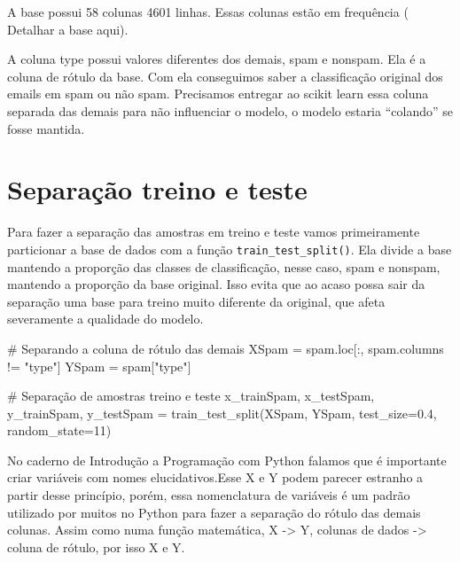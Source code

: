 \documentclass[
  letterpaper,
  DIV=11,
  numbers=noendperiod]{scrreprt}
\newenvironment{Shaded}{\begin{snugshade}}{\end{snugshade}}
\newcommand{\CommentTok}[1]{\textcolor[rgb]{0.37,0.37,0.37}{#1}}
\newcommand{\DecValTok}[1]{\textcolor[rgb]{0.68,0.00,0.00}{#1}}
\newcommand{\FloatTok}[1]{\textcolor[rgb]{0.68,0.00,0.00}{#1}}
\newcommand{\NormalTok}[1]{\textcolor[rgb]{0.00,0.23,0.31}{#1}}
\newcommand{\OperatorTok}[1]{\textcolor[rgb]{0.37,0.37,0.37}{#1}}
\newcommand{\StringTok}[1]{\textcolor[rgb]{0.13,0.47,0.30}{#1}}
\begin{document}
A base possui 58 colunas 4601 linhas. Essas colunas estão em frequência
( Detalhar a base aqui).

A coluna type possui valores diferentes dos demais, spam e nonspam. Ela
é a coluna de rótulo da base. Com ela conseguimos saber a classificação
original dos emails em spam ou não spam. Precisamos entregar ao scikit
learn essa coluna separada das demais para não influenciar o modelo, o
modelo estaria ``colando'' se fosse mantida.

\hypertarget{separauxe7uxe3o-treino-e-teste}{%
\section{Separação treino e
teste}\label{separauxe7uxe3o-treino-e-teste}}

Para fazer a separação das amostras em treino e teste vamos
primeiramente particionar a base de dados com a função
\texttt{train\_test\_split()}. Ela divide a base mantendo a proporção
das classes de classificação, nesse caso, spam e nonspam, mantendo a
proporção da base original. Isso evita que ao acaso possa sair da
separação uma base para treino muito diferente da original, que afeta
severamente a qualidade do modelo.

\begin{Shaded}
\begin{Highlighting}[]
\CommentTok{\# Separando a coluna de rótulo das demais}
\NormalTok{XSpam }\OperatorTok{=}\NormalTok{ spam.loc[:, spam.columns }\OperatorTok{!=} \StringTok{"type"}\NormalTok{]}
\NormalTok{YSpam }\OperatorTok{=}\NormalTok{ spam[}\StringTok{"type"}\NormalTok{]}

\CommentTok{\# Separação de amostras treino e teste}
\NormalTok{x\_trainSpam, x\_testSpam, y\_trainSpam, y\_testSpam }\OperatorTok{=}\NormalTok{ train\_test\_split(XSpam, YSpam, test\_size}\OperatorTok{=}\FloatTok{0.4}\NormalTok{, random\_state}\OperatorTok{=}\DecValTok{11}\NormalTok{)}
\end{Highlighting}
\end{Shaded}

No caderno de Introdução a Programação com Python falamos que é
importante criar variáveis com nomes elucidativos.Esse X e Y podem
parecer estranho a partir desse princípio, porém, essa nomenclatura de
variáveis é um padrão utilizado por muitos no Python para fazer a
separação do rótulo das demais colunas. Assim como numa função
matemática, X -\textgreater{} Y, colunas de dados -\textgreater{} coluna
de rótulo, por isso X e Y.
\end{document}
